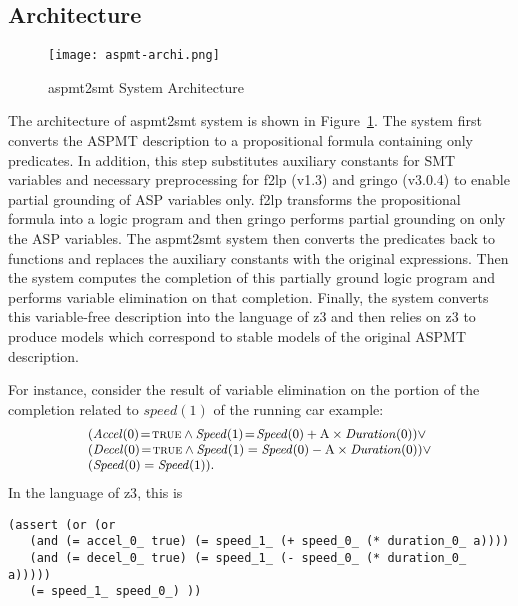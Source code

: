 \documentclass[runningheads]{llncs}
\def\ba{\begin{array}}
\def\ea{\end{array}}
\def\i#1{\hbox{\it #1\/}}
\def\mvis{\!=\!}
\def\true{\hbox{\sc true}}
\begin{document}
\subsection{Architecture}

\begin{figure}
\centering
 \texttt{[image: aspmt-archi.png]}
\caption{{\sc aspmt2smt} System Architecture}
\label{fig:architecture}
\end{figure}
%
The architecture of {\sc aspmt2smt} system is shown in Figure~\ref{fig:architecture}.
The system first converts the ASPMT description to a
propositional formula containing only predicates. In addition, this
step substitutes auxiliary constants for SMT variables and necessary
preprocessing for {\sc f2lp} (v1.3) and {\sc gringo} (v3.0.4) to enable partial grounding of ASP variables only. {\sc f2lp} transforms the propositional formula
into a logic program and then {\sc gringo} performs partial grounding
on only the ASP variables. The {\sc aspmt2smt} system then
converts the predicates back to functions and replaces the 
auxiliary constants with the original expressions. Then the system
computes the completion of this partially ground logic program and
performs variable elimination on that  completion. Finally, the system
 converts this variable-free description into the language of {\sc
  z3} and then relies on {\sc z3} to produce models which correspond
to stable models of the original ASPMT description.

For instance, consider the result of variable elimination on the 
portion of the completion related to $speed(1)$ of the running car example:
\[
\small
\ba{l}
(\i{Accel}(0)\mvis\true\land \i{Speed}(1)\mvis \i{Speed}(0) 
      + {\rm A}\times\i{Duration}(0)) \lor \\
(\i{Decel}(0)\mvis\true\land \i{Speed}(1) = \i{Speed}(0) - {\rm
  A}\times \i{Duration}(0)) \lor \\
(\i{Speed}(0) = \i{Speed}(1)).
\ea
\]
In the language of {\sc z3}, this is
\begin{lstlisting}
(assert (or (or 
   (and (= accel_0_ true) (= speed_1_ (+ speed_0_ (* duration_0_ a))))
   (and (= decel_0_ true) (= speed_1_ (- speed_0_ (* duration_0_ a)))))
   (= speed_1_ speed_0_) ))
\end{lstlisting}
\end{document}
